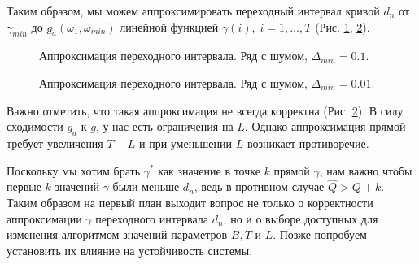 \documentclass[specialist, substylefile = spbu.rtx,
			   subf, href, 12pt]{disser}
\begin{document}
Таким образом, мы можем аппроксимировать переходный интервал кривой $ d_n $ от $ \gamma_{min} $ до $ g_a(\omega_1, \omega_{min}) $ линейной функцией $ \gamma(i),\; i=1, \dots, T $ (Рис. \ref{pic:row_linear_approximation_1}, \ref{pic:row_linear_approximation_2}).

\begin{figure}[!hhh]
	\caption{Аппроксимация переходного интервала. Ряд с шумом, $ \Delta_{min} = 0.1 $.}
	\label{pic:row_linear_approximation_1}
\end{figure}

\begin{figure}[!hhh]
	\caption{Аппроксимация переходного интервала. Ряд с шумом, $ \Delta_{min} = 0.01 $.}
	\label{pic:row_linear_approximation_2}
\end{figure}

Важно отметить, что такая аппроксимация не всегда корректна (Рис. \ref{pic:row_linear_approximation_2}). В силу сходимости $ g_a $ к $ g $, у нас есть ограничения на $ L $. Однако аппроксимация прямой требует увеличения $ T - L $ и при уменьшении $ L $ возникает противоречие.

Поскольку мы хотим брать $ \gamma^* $ как значение в точке $ k $ прямой $ \gamma $, нам важно чтобы первые $ k $ значений $ \gamma $ были меньше $ d_n $, ведь в противном случае $ \hat{Q} > Q+k $. Таким образом на первый план выходит вопрос не только о корректности аппроксимации $ \gamma $ переходного интервала $ d_n $, но и о выборе доступных для изменения алгоритмом значений параметров $ B, T $ и $ L $. Позже попробуем установить их влияние на устойчивость системы.
\end{document}
